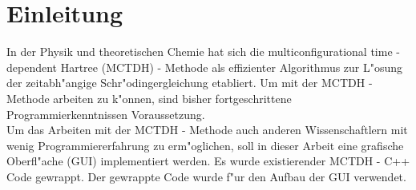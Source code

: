 \chapter{Einleitung}

In der Physik und theoretischen Chemie hat sich die multiconfigurational time - dependent Hartree (MCTDH) - Methode
als effizienter Algorithmus zur L"osung der zeitabh"angige Schr"odingergleichung etabliert.
Um mit der MCTDH - Methode arbeiten zu k"onnen, sind bisher fortgeschrittene Programmierkenntnissen Voraussetzung.\\
Um das Arbeiten mit der MCTDH - Methode auch anderen Wissenschaftlern mit wenig Programmiererfahrung zu erm"oglichen,
soll in dieser Arbeit eine grafische Oberfl"ache (GUI) implementiert werden.
Es wurde existierender MCTDH - C++ Code gewrappt. Der gewrappte Code wurde f"ur den Aufbau der GUI verwendet.
